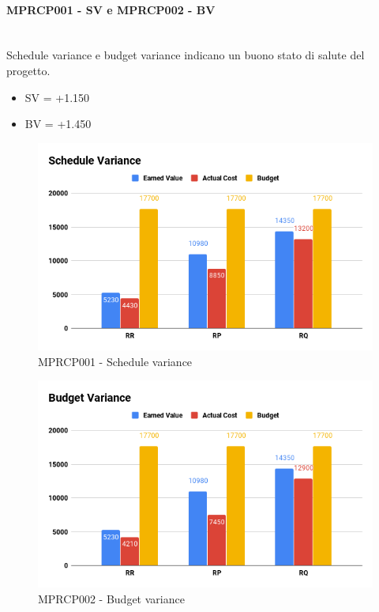 \paragraph{MPRCP001 - SV e MPRCP002 -  BV}\mbox{}\\[0.4cm]
Schedule variance e budget variance indicano un buono stato di salute del progetto.
\begin{itemize}
	\item SV = +1.150
	\item BV = +1.450
\end{itemize}
\begin{figure}[H]
	\centering
	\includegraphics[width=13cm,keepaspectratio]{../includes/pics/Schedule_Variance.png}
	\caption{\label{fig:mission}MPRCP001 - Schedule variance}
\end{figure}
\begin{figure}[H]
	\centering
	\includegraphics[width=13cm,keepaspectratio]{../includes/pics/Budget_Variance.png}
	\caption{\label{fig:mission}MPRCP002 - Budget variance}
\end{figure}
